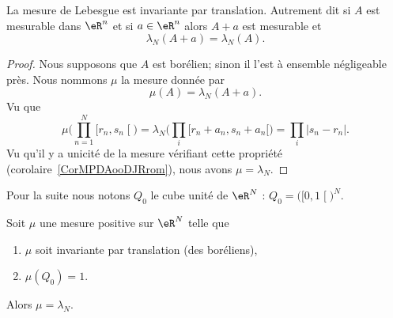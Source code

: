 \begin{theorem}        \label{THOooTMWHooThsDHj}
	La mesure de Lebesgue est invariante par translation. Autrement dit si \( A\) est mesurable dans \( \eR^n\) et si \( a\in \eR^n\) alors \( A+a\) est mesurable et
	\begin{equation}
		\lambda_N(A+a)=\lambda_N(A).
	\end{equation}
\end{theorem}

\begin{proof}
	Nous supposons que \( A\) est borélien; sinon il l'est à ensemble négligeable près. Nous nommons \( \mu\) la mesure donnée par
	\begin{equation}
		\mu(A)=\lambda_N(A+a).
	\end{equation}
	Vu que
	\begin{equation}
		\mu\big( \prod_{n=1}^N\mathopen[ r_n , s_n \mathclose[ \big)=\lambda_N\big( \prod_i\mathopen[ r_n+a_n , s_n+a_n [ \big)=\prod_i| s_n-r_n |.
	\end{equation}
	Vu qu'il y a unicité de la mesure vérifiant cette propriété (corolaire~\ref{CorMPDAooDJRrom}), nous avons \( \mu=\lambda_N\).
\end{proof}

Pour la suite nous notons \( Q_0\) le cube unité de \( \eR^N\) : \( Q_0=\big( \mathopen[ 0 , 1 \mathclose[ \big)^N\).

\begin{theorem}        \label{ThoCABFooHbUzWc}
	Soit \( \mu\) une mesure positive sur \( \eR^N\) telle que
	\begin{enumerate}
		\item
		      \( \mu\) soit invariante par translation (des boréliens),
		\item
		      \( \mu(Q_0)=1\).
	\end{enumerate}
	Alors \( \mu=\lambda_N\).
\end{theorem}

